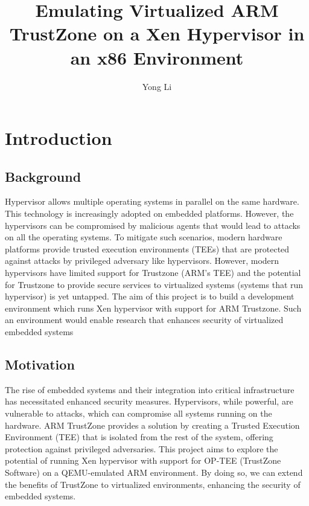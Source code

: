 \documentclass[acmtog]{acmart}
\begin{document}
\title{Emulating Virtualized ARM TrustZone on a Xen Hypervisor in an x86 Environment}


\author{Yong Li}

\renewcommand{\shortauthors}{Yong Li}


\begin{abstract}
\end{abstract}

\maketitle

\section{Introduction}




\subsection{Background}
Hypervisor allows multiple operating systems in parallel on the same hardware. This
technology is increasingly adopted on embedded platforms. However, the hypervisors can be
compromised by malicious agents that would lead to attacks on all the operating systems. To mitigate
such scenarios, modern hardware platforms provide trusted execution environments (TEEs) that are
protected against attacks by privileged adversary like hypervisors. However, modern hypervisors have
limited support for Trustzone (ARM’s TEE) and the potential for Trustzone to provide secure services to
virtualized systems (systems that run hypervisor) is yet untapped. The aim of this project is to build a
development environment which runs Xen hypervisor with support for ARM Trustzone. Such an
environment would enable research that enhances security of virtualized embedded systems

\subsection{Motivation}
The rise of embedded systems and their integration into critical infrastructure has necessitated enhanced security measures. Hypervisors, while powerful, are vulnerable to attacks, which can compromise all systems running on the hardware. ARM TrustZone provides a solution by creating a Trusted Execution Environment (TEE) that is isolated from the rest of the system, offering protection against privileged adversaries. This project aims to explore the potential of running Xen hypervisor with support for OP-TEE (TrustZone Software) on a QEMU-emulated ARM environment. By doing so, we can extend the benefits of TrustZone to virtualized environments, enhancing the security of embedded systems.
\end{document}
